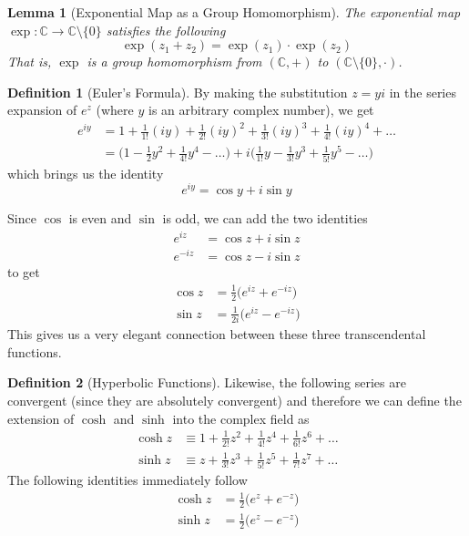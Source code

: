 \documentclass{article}
\newtheorem{lemma}[theorem]{Lemma}
\theoremstyle{remark}
\theoremstyle{definition}
\newtheorem{definition}{Definition}[section]
\begin{document}
\begin{lemma}[Exponential Map as a Group Homomorphism]
The exponential map $\exp: \mathbb{C} \longrightarrow \mathbb{C}\setminus \{0\}$ satisfies the following
\[\exp(z_1 + z_2) = \exp(z_1) \cdot \exp (z_2)\]
That is, $\exp$ is a group homomorphism from $(\mathbb{C}, +)$ to $(\mathbb{C} \setminus \{0\}, \cdot)$. 
\end{lemma}

\begin{definition}[Euler's Formula]
By making the substitution $z = yi$ in the series expansion of $e^z$ (where $y$ is an arbitrary complex number), we get 
\begin{align*}
    e^{iy} & = 1 + \frac{1}{1!} (iy) + \frac{1}{2!}(iy)^2 + \frac{1}{3!} (iy)^3 + \frac{1}{4!} (iy)^4 + \ldots \\
    & = \bigg(1 - \frac{1}{2} y^2 + \frac{1}{4!} y^4 - \ldots \bigg) + i \bigg(\frac{1}{1!} y - \frac{1}{3!} y^3 + \frac{1}{5!} y^5 - \ldots \bigg)
\end{align*}
which brings us the identity
\[e^{iy} = \cos{y} + i \sin{y}\]
\end{definition}

Since $\cos$ is even and $\sin$ is odd, we can add the two identities
\begin{align*}
    e^{iz} & = \cos{z} + i \sin{z} \\
    e^{-iz} & = \cos{z} - i \sin{z} 
\end{align*}
to get 
\begin{align*}
    \cos{z} & = \frac{1}{2}\big( e^{iz} + e^{-iz} \big) \\
    \sin{z} & = \frac{1}{2i} \big( e^{iz} - e^{-iz} \big)
\end{align*}
This gives us a very elegant connection between these three transcendental functions. 

\begin{definition}[Hyperbolic Functions]
Likewise, the following series are convergent (since they are absolutely convergent) and therefore we can define the extension of $\cosh$ and $\sinh$ into the complex field as 
\begin{align*}
    \cosh{z} & \equiv 1 + \frac{1}{2!} z^2 + \frac{1}{4!} z^4 + \frac{1}{6!} z^6 + \ldots \\
    \sinh{z} & \equiv z + \frac{1}{3!} z^3 + \frac{1}{5!} z^5 + \frac{1}{7!} z^7 + \ldots 
\end{align*}
The following identities immediately follow
\begin{align*}
    \cosh{z} & = \frac{1}{2} \big( e^z + e^{-z} \big) \\
    \sinh{z} & = \frac{1}{2} \big( e^{z} - e^{-z}\big) 
\end{align*}
\end{definition}
\end{document}
